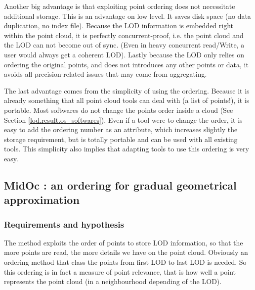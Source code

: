 			Another big advantage is that exploiting point ordering does not necessitate additional storage.
			This is an advantage on low level. It saves disk space (no data duplication, no index file). Because the LOD information is embedded right within the point cloud, it is perfectly concurrent-proof, i.e. the point cloud and the LOD can not become out of sync.
			(Even in heavy concurrent read/Write, a user would always get a coherent LOD).
			Lastly because the LOD only relies on ordering the original points, and does not introduces any other points or data, it avoids all precision-related issues that may come from aggregating.
			
			The last advantage comes from the simplicity of using the ordering. 
			Because it is already something that all point cloud tools can deal with (a list of points!), it is portable. Most softwares do not change the points order inside a cloud (See Section \ref{lod.result.os_softwares}).
			Even if a tool were to change the order, it is easy to add the ordering number as an attribute, which increases slightly the storage requirement, but is totally portable and can be used with all existing tools.
			This simplicity also implies that adapting tools to use this ordering is very easy.
	
	
	\subsection{MidOc : an ordering for gradual geometrical approximation}
		\label{lod.method:midoc}
		\subsubsection{Requirements and hypothesis}
		\label{lod.method.midoc.hypothesis}
		The method exploits the order of points to store LOD information, so that the more points are read, the more details we have on the point cloud.
		Obviously an ordering method that class the points from first LOD to last LOD is needed.
		So this ordering is in fact a measure of point relevance, that is how well a point represents the point cloud (in a neighbourhood depending of the LOD).
		
